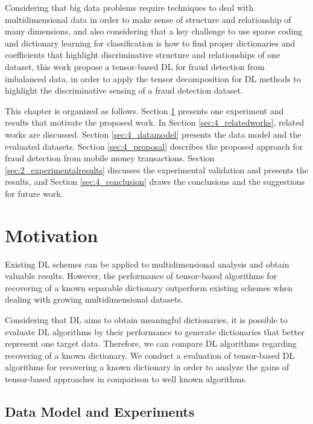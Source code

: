 Considering that big data problems require techniques to deal with multidimensional data in order to make sense of structure and relationship of many dimensions, and also considering that a key challenge to use sparse coding and dictionary learning for classification is how to find proper dictionaries and coefficients that highlight discriminative structure and relationships of one dataset, this work propose a tensor-based DL for fraud detection from imbalanced data, in order to apply the tensor decomposition for DL methods to highlight the discriminative sensing of a fraud detection dataset. 

This chapter is organized as follows. Section \ref{sec:4_motivation} presents one experiment and results that motivate the proposed work. In Section \ref{sec:4_relatedworks}, related works are discussed. Section \ref{sec:4_datamodel} presents the data model and the evaluated datasets. Section \ref{sec:4_proposal} describes the proposed approach for fraud detection from mobile money transactions. Section \ref{sec:2_experimentalresults} discusses the experimental validation and presents the results, and Section \ref{sec:4_conclusion} draws the conclusions and the suggestions for future work.


\section{Motivation}
\label{sec:4_motivation}

Existing DL schemes can be applied to multidimensional analysis and obtain valuable results. However, the performance of tensor-based algorithms for recovering of a known separable dictionary outperform existing schemes when dealing with growing multidimensional datasets.

Considering that DL aims to obtain meaningful dictionaries, it is possible to evaluate DL algorithms by their performance to generate dictionaries that better represent one target data. Therefore, we can compare DL algorithms regarding recovering of a known dictionary. We conduct a evaluation of tensor-based DL algorithms for recovering a known dictionary in order to analyze the gains of tensor-based approaches in comparison to well known algorithms.

\subsection{Data Model and Experiments}
\label{sec:4_motivation_datamodel}

